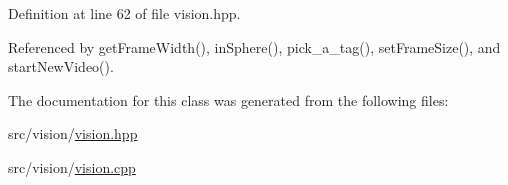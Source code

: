 Definition at line 62 of file vision.\+hpp.



Referenced by get\+Frame\+Width(), in\+Sphere(), pick\+\_\+a\+\_\+tag(), set\+Frame\+Size(), and start\+New\+Video().



The documentation for this class was generated from the following files\+:\begin{DoxyCompactItemize}
\item 
src/vision/\hyperlink{vision_8hpp}{vision.\+hpp}\item 
src/vision/\hyperlink{vision_8cpp}{vision.\+cpp}\end{DoxyCompactItemize}
